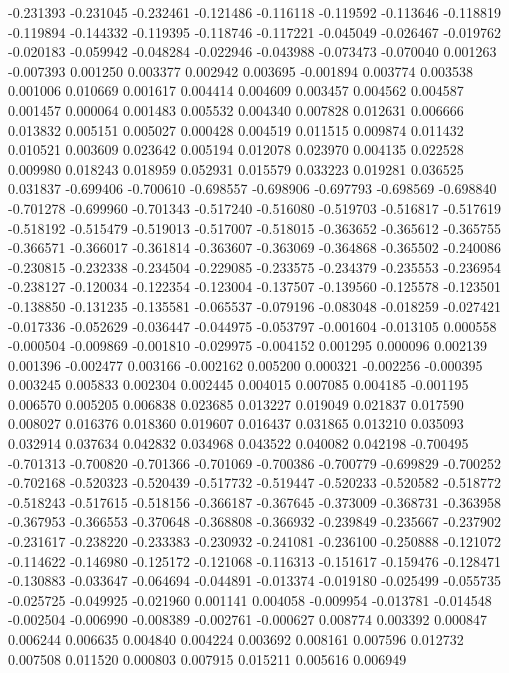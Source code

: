 -0.231393
-0.231045
-0.232461
-0.121486
-0.116118
-0.119592
-0.113646
-0.118819
-0.119894
-0.144332
-0.119395
-0.118746
-0.117221
-0.045049
-0.026467
-0.019762
-0.020183
-0.059942
-0.048284
-0.022946
-0.043988
-0.073473
-0.070040
0.001263
-0.007393
0.001250
0.003377
0.002942
0.003695
-0.001894
0.003774
0.003538
0.001006
0.010669
0.001617
0.004414
0.004609
0.003457
0.004562
0.004587
0.001457
0.000064
0.001483
0.005532
0.004340
0.007828
0.012631
0.006666
0.013832
0.005151
0.005027
0.000428
0.004519
0.011515
0.009874
0.011432
0.010521
0.003609
0.023642
0.005194
0.012078
0.023970
0.004135
0.022528
0.009980
0.018243
0.018959
0.052931
0.015579
0.033223
0.019281
0.036525
0.031837
-0.699406
-0.700610
-0.698557
-0.698906
-0.697793
-0.698569
-0.698840
-0.701278
-0.699960
-0.701343
-0.517240
-0.516080
-0.519703
-0.516817
-0.517619
-0.518192
-0.515479
-0.519013
-0.517007
-0.518015
-0.363652
-0.365612
-0.365755
-0.366571
-0.366017
-0.361814
-0.363607
-0.363069
-0.364868
-0.365502
-0.240086
-0.230815
-0.232338
-0.234504
-0.229085
-0.233575
-0.234379
-0.235553
-0.236954
-0.238127
-0.120034
-0.122354
-0.123004
-0.137507
-0.139560
-0.125578
-0.123501
-0.138850
-0.131235
-0.135581
-0.065537
-0.079196
-0.083048
-0.018259
-0.027421
-0.017336
-0.052629
-0.036447
-0.044975
-0.053797
-0.001604
-0.013105
0.000558
-0.000504
-0.009869
-0.001810
-0.029975
-0.004152
0.001295
0.000096
0.002139
0.001396
-0.002477
0.003166
-0.002162
0.005200
0.000321
-0.002256
-0.000395
0.003245
0.005833
0.002304
0.002445
0.004015
0.007085
0.004185
-0.001195
0.006570
0.005205
0.006838
0.023685
0.013227
0.019049
0.021837
0.017590
0.008027
0.016376
0.018360
0.019607
0.016437
0.031865
0.013210
0.035093
0.032914
0.037634
0.042832
0.034968
0.043522
0.040082
0.042198
-0.700495
-0.701313
-0.700820
-0.701366
-0.701069
-0.700386
-0.700779
-0.699829
-0.700252
-0.702168
-0.520323
-0.520439
-0.517732
-0.519447
-0.520233
-0.520582
-0.518772
-0.518243
-0.517615
-0.518156
-0.366187
-0.367645
-0.373009
-0.368731
-0.363958
-0.367953
-0.366553
-0.370648
-0.368808
-0.366932
-0.239849
-0.235667
-0.237902
-0.231617
-0.238220
-0.233383
-0.230932
-0.241081
-0.236100
-0.250888
-0.121072
-0.114622
-0.146980
-0.125172
-0.121068
-0.116313
-0.151617
-0.159476
-0.128471
-0.130883
-0.033647
-0.064694
-0.044891
-0.013374
-0.019180
-0.025499
-0.055735
-0.025725
-0.049925
-0.021960
0.001141
0.004058
-0.009954
-0.013781
-0.014548
-0.002504
-0.006990
-0.008389
-0.002761
-0.000627
0.008774
0.003392
0.000847
0.006244
0.006635
0.004840
0.004224
0.003692
0.008161
0.007596
0.012732
0.007508
0.011520
0.000803
0.007915
0.015211
0.005616
0.006949
